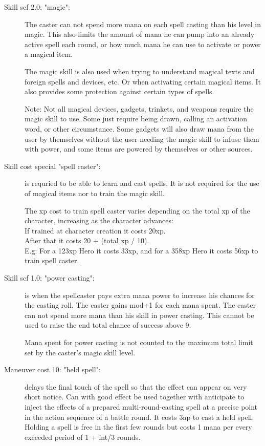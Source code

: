 \begin{description}


\item[Skill scf 2.0: "magic":] The caster can not spend more mana on each spell casting than his level in magic. This also limits the amount of mana he can pump into an already active spell each round, or how much mana he can use to activate or power a magical item.

The magic skill is also used when trying to understand magical texts and foreign spells and devices, etc. Or when activating certain magical items. It also provides some protection against certain types of spells.

Note: Not all magical devices, gadgets, trinkets, and weapons require the magic skill to use. Some just require being drawn, calling an activation word, or other circumstance. Some gadgets will also draw mana from the user by themselves without the user needing the magic skill to infuse them with power, and some items are powered by themselves or other sources.


\item[Skill cost special "spell caster":] is requried to be able to learn and cast spells. It is not required for the use of magical items nor to train the magic skill.

The xp cost to train spell caster varies depending on the total xp of the character, increasing as the character advances:\\
If trained at character creation it costs 20xp.\\
After that it costs 20 + (total xp / 10).\\
E.g: For a 123xp Hero it costs 33xp, and for a 358xp Hero it costs 56xp to train spell caster.


\item[Skill scf 1.0: "power casting":] is when the spellcaster pays extra mana power to increase his chances for the casting roll. The caster gains mod+1 for each mana spent. The caster can not spend more mana than his skill in power casting. This cannot be used to raise the end total chance of success above 9.

Mana spent for power casting is not counted to the maximum total limit set by the caster's magic skill level.


\item[Maneuver cost 10: "held spell":] delays the final touch of the spell so that the effect can appear on very short notice. Can with good effect be used together with anticipate to inject the effects of a prepared multi-round-casting spell at a precise point in the action sequence of a battle round. It costs 3ap to cast a held spell. Holding a spell is free in the first few rounds but costs 1 mana per every exceeded period of 1 + int/3 rounds.



\end{description}
